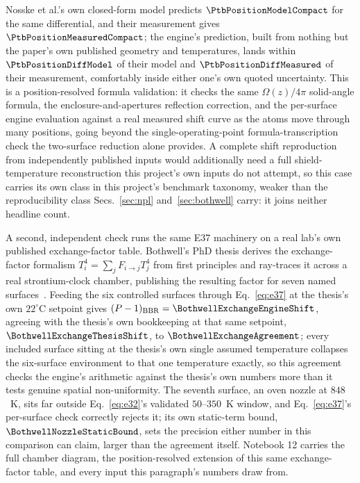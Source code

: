 \documentclass[aps,pra,superscriptaddress,groupedaddress,nofootinbib]{revtex4-2}
\begin{document}
Nosske et al.'s own closed-form model predicts $\PtbPositionModelCompact$
for the same differential, and their measurement gives
$\PtbPositionMeasuredCompact$; the engine's prediction, built from nothing
but the paper's own published geometry and temperatures, lands within
$\PtbPositionDiffModel$ of their model and $\PtbPositionDiffMeasured$ of
their measurement, comfortably inside either one's own quoted uncertainty.
This is a position-resolved formula validation: it checks the same
$\Omega(z)/4\pi$ solid-angle formula, the enclosure-and-apertures reflection
correction, and the per-surface engine evaluation against a real measured
shift curve as the atoms move through many positions, going beyond the
single-operating-point formula-transcription check the two-surface
reduction alone provides. A complete shift reproduction from independently
published inputs would additionally need a full shield-temperature
reconstruction this project's own inputs do not attempt, so this case
carries its own class in this project's benchmark taxonomy, weaker than the
reproducibility class Secs.~\ref{sec:npl} and~\ref{sec:bothwell} carry: it
joins neither headline count.

A second, independent check runs the same E37 machinery on a real lab's own
published exchange-factor table. Bothwell's PhD thesis derives the
exchange-factor formalism $T_i^4=\sum_j F_{i\to j}T_j^4$ from first
principles and ray-traces it across a real strontium-clock chamber,
publishing the resulting factor for seven named
surfaces~\cite{Bothwell2022thesis}. Feeding the six controlled surfaces
through Eq.~\eqref{eq:e37} at the thesis's own $22^\circ$C setpoint gives
$(P-1)_{\rm BBR}=\BothwellExchangeEngineShift$, agreeing with the thesis's
own bookkeeping at that same setpoint, $\BothwellExchangeThesisShift$, to
$\BothwellExchangeAgreement$; every included surface sitting at the
thesis's own single assumed temperature collapses the six-surface
environment to that one temperature exactly, so this agreement checks the
engine's arithmetic against the thesis's own numbers more than it tests
genuine spatial non-uniformity. The seventh surface, an oven nozzle at
$848$~K, sits far outside Eq.~\eqref{eq:e32}'s validated $50$--$350$~K
window, and Eq.~\eqref{eq:e37}'s per-surface check correctly rejects it;
its own static-term bound, $\BothwellNozzleStaticBound$, sets the precision
either number in this comparison can claim, larger than the agreement
itself. Notebook 12 carries the full chamber diagram, the position-resolved
extension of this same exchange-factor table, and every input this
paragraph's numbers draw from.
\end{document}
